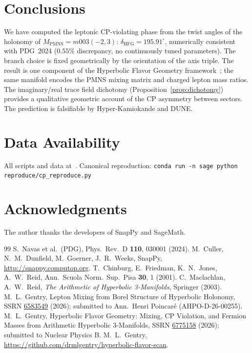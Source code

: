 \documentclass[11pt,a4paper]{article}
\theoremstyle{definition}
\theoremstyle{remark}
\newcommand{\MPMNS}{M_{\mathrm{PMNS}}}
\begin{document}
\section{Conclusions}
\label{sec:conclusions}

We have computed the leptonic CP-violating phase from the
twist angles of the holonomy of $\MPMNS=m003(-2,3)$:
$\delta_{\mathrm{HFG}}=195.91^\circ$, numerically consistent
with PDG~2024 ($0.55\%$ discrepancy, no continuously tuned
parameters).
The branch choice is fixed geometrically by the orientation of
the axis triple.
The result is one component of the Hyperbolic Flavor Geometry
framework~\cite{Gentry:Unified}; the same manifold encodes the
PMNS mixing matrix and charged lepton mass ratios.
The imaginary/real trace field dichotomy
(Proposition~\ref{prop:dichotomy}) provides a qualitative
geometric account of the CP asymmetry between sectors.
The prediction is falsifiable by Hyper-Kamiokande and DUNE.

\section*{Data Availability}
All scripts and data at~\cite{GitHub}.
Canonical reproduction:
\texttt{conda run -n sage python reproduce/cp\_reproduce.py}

\section*{Acknowledgments}
The author thanks the developers of SnapPy and SageMath.

\begin{thebibliography}{99}
S.~Navas et al.\ (PDG),
Phys.\ Rev.\ D \textbf{110}, 030001 (2024).
M.~Culler, N.~M.~Dunfield, M.~Goerner, J.~R.~Weeks,
SnapPy, \url{http://snappy.computop.org}.
T.~Chinburg, E.~Friedman, K.~N.~Jones, A.~W.~Reid,
Ann.\ Scuola Norm.\ Sup.\ Pisa \textbf{30}, 1 (2001).
C.~Maclachlan, A.~W.~Reid,
\emph{The Arithmetic of Hyperbolic 3-Manifolds}, Springer (2003).
M.~L.~Gentry,
Lepton Mixing from Borel Structure of Hyperbolic Holonomy,
SSRN \href{https://doi.org/10.2139/ssrn.6583549}{6583549} (2026);
submitted to Ann.\ Henri Poincar\'e (AHPO-D-26-00255).
M.~L.~Gentry,
Hyperbolic Flavor Geometry: Mixing, CP Violation, and Fermion
Masses from Arithmetic Hyperbolic 3-Manifolds,
SSRN \href{https://doi.org/10.2139/ssrn.6775158}{6775158} (2026);
submitted to Nuclear Physics B.
M.~L.~Gentry,
\url{https://github.com/drmlgentry/hyperbolic-flavor-scan}.
\end{thebibliography}
\end{document}

